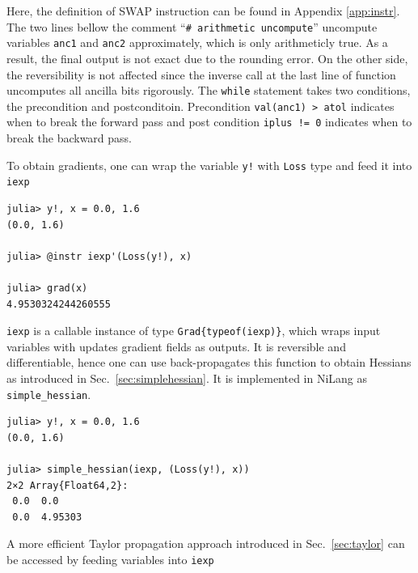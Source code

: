 \documentclass[aps,twocolumn,longbibliography,english,superscriptaddress]{revtex4-1}
\newcommand{\<}{\langle}
\renewcommand{\>}{\rangle}
\newcommand{\Fig}[1]{Fig.~\ref{#1}}
\newcommand{\Sec}[1]{Sec.~\ref{#1}}
\newcommand{\App}[1]{Appendix \ref{#1}}
\theoremstyle{definition}\newtheorem{definition}{\textit{Definition}}
\begin{document}
Here, the definition of SWAP instruction can be found in \App{app:instr}.
The two lines bellow the comment ``\texttt{\# arithmetic uncompute}'' uncompute variables \texttt{anc1} and \texttt{anc2} approximately, which is only arithmeticly true. As a result, the final output is not exact due to the rounding error. On the other side, the reversibility is not affected since the inverse call at the last line of function uncomputes all ancilla bits rigorously.
The \texttt{while} statement takes two conditions, the precondition and postconditoin. Precondition \texttt{val(anc1) > atol} indicates when to break the forward pass and post condition \texttt{iplus != 0} indicates when to break the backward pass.

To obtain gradients, one can wrap the variable \texttt{y!} with \texttt{Loss} type and feed it into \texttt{iexp\textquotesingle}

\begin{minipage}{.44\textwidth}
\begin{lstlisting}
julia> y!, x = 0.0, 1.6
(0.0, 1.6)

julia> @instr iexp'(Loss(y!), x)

julia> grad(x)
4.9530324244260555
\end{lstlisting}
\end{minipage}

\texttt{iexp\textquotesingle} is a callable instance of type \texttt{Grad\{typeof(iexp)\}}, which wraps input variables with updates gradient fields as outputs. It is reversible and differentiable, hence one can use back-propagates this function to obtain Hessians as introduced in \Sec{sec:simplehessian}. It is implemented in NiLang as   \texttt{simple\_hessian}.

\begin{minipage}{.44\textwidth}
\begin{lstlisting}
julia> y!, x = 0.0, 1.6
(0.0, 1.6)

julia> simple_hessian(iexp, (Loss(y!), x))
2×2 Array{Float64,2}:
 0.0  0.0
 0.0  4.95303
\end{lstlisting}
\end{minipage}


A more efficient Taylor propagation approach introduced in \Sec{sec:taylor} can be accessed by feeding variables into \texttt{iexp\textquotesingle\textquotesingle}
\end{document}
